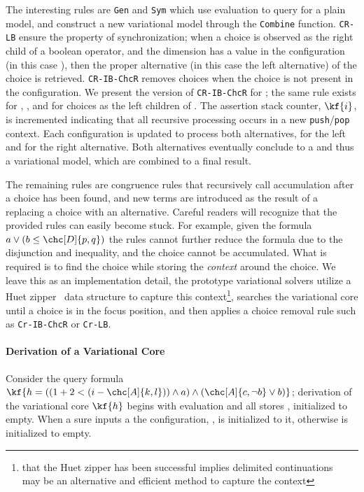 The interesting rules are \texttt{Gen} and \texttt{Sym} which use evaluation to
query for a plain model, and construct a new variational model through the
\texttt{Combine} function. \texttt{CR-LB} ensure the property of
synchronization; when a choice is observed as the right child of a boolean
operator, and the dimension has a value in the configuration (in this case
\true{}), then the proper alternative (in this case the left alternative) of the
choice is retrieved. \texttt{CR-IB-ChcR} removes choices when the choice is not
present in the configuration. We present the version of \texttt{CR-IB-ChcR} for
\inequalities{}; the same rule exists for \boolFuncs{}, \integerFuncs{}, and for
choices as the left children of \inequalities{}. The assertion stack counter,
$\kf{i}$, is incremented indicating that all recursive processing occurs in a
new \texttt{push}/\texttt{pop} context. Each configuration is updated to process
both alternatives, \true{} for the left and \false{} for the right alternative.
Both alternatives eventually conclude to a \unit{} and thus a variational model,
which are combined to a final result.

The remaining rules are congruence rules that recursively call accumulation
after a choice has been found, and new terms are introduced as the result of a
replacing a choice with an alternative. Careful readers will recognize that the
provided rules can easily become stuck. For example, given the formula $a \vee{}
(b \leq{} \chc[D]{p,q})$ the rules cannot further reduce the formula due to the
disjunction and inequality, and the choice cannot be accumulated. What is
required is to find the choice while storing the \emph{context} around the
choice. We leave this as an implementation detail, the prototype variational
solvers utilize a Huet zipper~\cite{huet_1997} data structure to capture this
context\footnote{that the Huet zipper has been successful implies delimited
  continuations~ may be an alternative and efficient method to
  capture the context}, searches the variational core until a choice is in the
focus position, and then applies a choice removal rule such as
\texttt{Cr-IB-ChcR} or \texttt{Cr-LB}.

\paragraph{Derivation of a Variational Core}
Consider the query formula $\kf{h = ((1 + 2 < (i - \chc[A]{k,l})) \wedge a)
  \wedge (\chc[A]{c,\neg b} \vee b)}$; derivation of the variational core
$\kf{h}$ begins with evaluation and all stores \aStore{}, \eStore{} initialized
to empty. When a sure inputs a \vc{} the configuration, \configuration{}, is
initialized to it, otherwise \configuration{} is initialized to empty.

